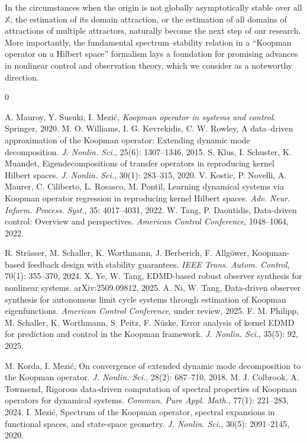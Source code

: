\documentclass[english]{cccconf}
\renewcommand{\emph}[1]{\textit{#1}}
\newcommand{\mbb}[1]{\mathds{#1}} %
\newcommand{\mX}{\mbb{X}}
\begin{document}
\par  In the circumstances when the origin is not globally asymptotically stable over all $\mX$, the estimation of its domain attraction, or the estimation of all domains of attractions of multiple attractors, naturally become the next step of our research. 
More importantly, the fundamental spectrum--stability relation in a ``Koopman operator on a Hilbert space'' formalism lays a foundation for promising advances in nonlinear control and observation theory, which we consider as a noteworthy direction. 


\begin{thebibliography}{0}
\begin{scriptsize}
A. Mauroy, Y. Susuki, I. Mezi{\'{c}}, \emph{Koopman operator in systems and control}. Springer, 2020. 
M. O. Williams, I. G. Kevrekidis, C. W. Rowley, A data–driven approximation of the Koopman operator: Extending dynamic mode decomposition. \emph{J. Nonlin. Sci.}, 25(6): 1307--1346, 2015. 
S. Klus, I. Schuster, K. Muandet, Eigendecompositions of transfer operators in reproducing kernel Hilbert spaces. \emph{J. Nonlin. Sci.}, 30(1): 283--315, 2020.
V. Kostic, P. Novelli, A. Maurer, C. Ciliberto, L. Rosasco, M. Pontil, Learning dynamical systems via Koopman operator regression in reproducing kernel Hilbert spaces. \emph{Adv. Neur. Inform. Process. Syst.}, 35: 4017--4031, 2022. 
W. Tang, P. Daoutidis, Data-driven control: Overview and perspectives. \emph{American Control Conference}, 1048--1064, 2022.

R. Str{\"{a}}sser, M. Schaller, K. Worthmann, J. Berberich, F. Allg{\"{o}}wer, Koopman-based feedback design with stability guarantees. \emph{IEEE Trans. Autom. Control}, 70(1): 355--370, 2024. 
X. Ye, W. Tang, EDMD-based robust observer synthesis for nonlinear systems. arXiv:2509.09812, 2025.
A. Ni, W. Tang, Data-driven observer synthesis for autonomous limit cycle systems through estimation of Koopman eigenfunctions. \emph{American Control Conference}, under review, 2025.
F. M. Philipp, M. Schaller, K. Worthmann, S. Peitz, F. N{\"{u}}ske, Error analysis of kernel EDMD for prediction and control in the Koopman framework. \emph{J. Nonlin. Sci.}, 35(5): 92, 2025.

M. Korda, I. Mezi{\'{c}}, On convergence of extended dynamic mode decomposition to the Koopman operator. \emph{J. Nonlin. Sci.}, 28(2): 687--710, 2018.
M. J. Colbrook, A. Townsend, Rigorous data‐driven computation of spectral properties of Koopman operators for dynamical systems. \emph{Commun. Pure Appl. Math.}, 77(1): 221--283, 2024. 
I. Mezi{\'{c}}, Spectrum of the Koopman operator, spectral expansions in functional spaces, and state-space geometry. \emph{J. Nonlin. Sci.}, 30(5): 2091--2145, 2020. 


\end{scriptsize}
\end{thebibliography}
\end{document}
